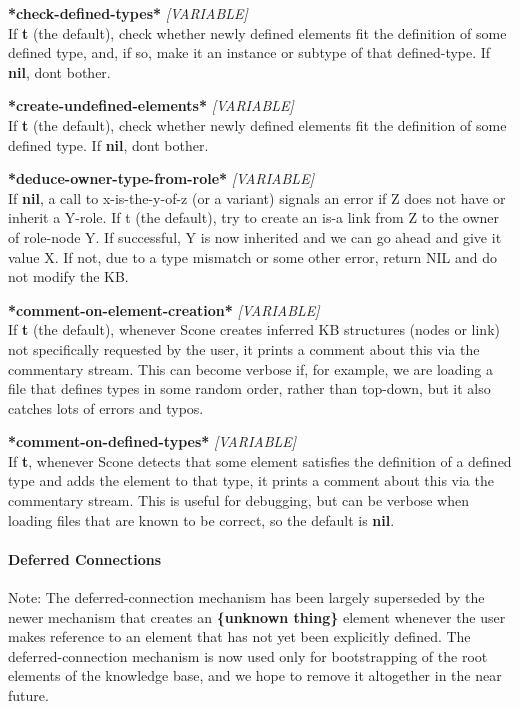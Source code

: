 \documentclass[titlepage,twoside,openright,11pt]{article}
\begin{document}
\textbf{*check-defined-types*} \emph{{[}VARIABLE{]}}\\
If \textbf{t} (the default), check whether newly defined elements fit
the definition of some defined type, and, if so, make it an instance or
subtype of that defined-type. If \textbf{nil}, don\textquotesingle t
bother.

\textbf{*create-undefined-elements*} \emph{{[}VARIABLE{]}}\\
If \textbf{t} (the default), check whether newly defined elements fit
the definition of some defined type. If \textbf{nil},
don\textquotesingle t bother.

\textbf{*deduce-owner-type-from-role*} \emph{{[}VARIABLE{]}}\\
If \textbf{nil}, a call to x-is-the-y-of-z (or a variant) signals an
error if Z does not have or inherit a Y-role. If t (the default), try to
create an is-a link from Z to the owner of role-node Y. If successful, Y
is now inherited and we can go ahead and give it value X. If not, due to
a type mismatch or some other error, return NIL and do not modify the
KB.

\textbf{*comment-on-element-creation*} \emph{{[}VARIABLE{]}}\\
If \textbf{t} (the default), whenever Scone creates inferred KB
structures (nodes or link) not specifically requested by the user, it
prints a comment about this via the commentary stream. This can become
verbose if, for example, we are loading a file that defines types in
some random order, rather than top-down, but it also catches lots of
errors and typos.

\textbf{*comment-on-defined-types*} \emph{{[}VARIABLE{]}}\\
If \textbf{t}, whenever Scone detects that some element satisfies the
definition of a defined type and adds the element to that type, it
prints a comment about this via the commentary stream. This is useful
for debugging, but can be verbose when loading files that are known to
be correct, so the default is \textbf{nil}.

\paragraph{Deferred Connections}\label{deferred-connections}

Note: The deferred-connection mechanism has been largely superseded by
the newer mechanism that creates an \textbf{\{unknown thing\}} element
whenever the user makes reference to an element that has not yet been
explicitly defined. The deferred-connection mechanism is now used only
for bootstrapping of the root elements of the knowledge base, and we
hope to remove it altogether in the near future.
\end{document}
